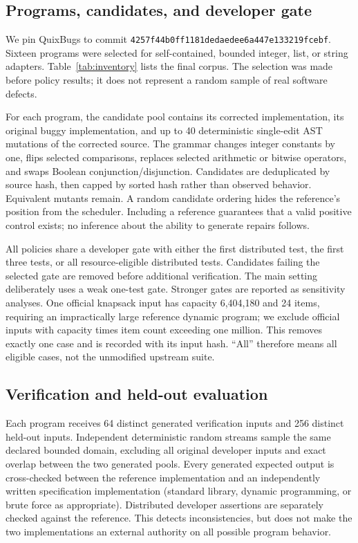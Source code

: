 \documentclass[10pt]{article}
\begin{document}
\subsection{Programs, candidates, and developer gate}
We pin QuixBugs to commit \texttt{4257f44b0ff1181dedaedee6a447e133219fcebf}. Sixteen programs were selected for self-contained, bounded integer, list, or string adapters. Table~\ref{tab:inventory} lists the final corpus. The selection was made before policy results; it does not represent a random sample of real software defects.

For each program, the candidate pool contains its corrected implementation, its original buggy implementation, and up to 40 deterministic single-edit AST mutations of the corrected source. The grammar changes integer constants by one, flips selected comparisons, replaces selected arithmetic or bitwise operators, and swaps Boolean conjunction/disjunction. Candidates are deduplicated by source hash, then capped by sorted hash rather than observed behavior. Equivalent mutants remain. A random candidate ordering hides the reference's position from the scheduler. Including a reference guarantees that a valid positive control exists; no inference about the ability to generate repairs follows.

All policies share a developer gate with either the first distributed test, the first three tests, or all resource-eligible distributed tests. Candidates failing the selected gate are removed before additional verification. The main setting deliberately uses a weak one-test gate. Stronger gates are reported as sensitivity analyses. One official knapsack input has capacity 6,404,180 and 24 items, requiring an impractically large reference dynamic program; we exclude official inputs with capacity times item count exceeding one million. This removes exactly one case and is recorded with its input hash. ``All'' therefore means all eligible cases, not the unmodified upstream suite.

\subsection{Verification and held-out evaluation}
Each program receives 64 distinct generated verification inputs and 256 distinct held-out inputs. Independent deterministic random streams sample the same declared bounded domain, excluding all original developer inputs and exact overlap between the two generated pools. Every generated expected output is cross-checked between the reference implementation and an independently written specification implementation (standard library, dynamic programming, or brute force as appropriate). Distributed developer assertions are separately checked against the reference. This detects inconsistencies, but does not make the two implementations an external authority on all possible program behavior.
\end{document}
